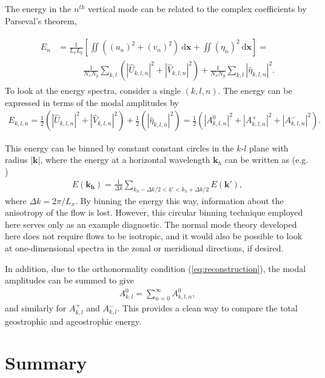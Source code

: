 The energy in the $n^{th}$ vertical mode can be related to the complex coefficients by Parseval's theorem,

\begin{align}
\begin{split}
E_n &= \frac{1}{L_x L_y} \left[ \iint ( (u_n)^2 + (v_n)^2) ~\text{d}\mathbf{x}  + \iint (\eta_n)^2 ~\text{d}\mathbf{x} \right]  = \\
&\quad\quad\quad \frac{1}{N_x N_y} \sum_{k,l} (|\widehat{U}_{k,l,n}|^2 + |\widehat{V}_{k,l,n}|^2) + \frac{1}{N_x N_y} \sum_{k,l} |\widehat{\eta}_{k,l,n}|^2.
\end{split}
\end{align}
To look at the energy spectra, consider a single $(k,l,n)$. The energy can be expressed in terms of the modal amplitudes by
\begin{align}
E_{k,l,n} = \frac{1}{2} \left( |\widehat{U}_{k,l,n}|^2 + |\widehat{V}_{k,l,n}|^2 \right) + \frac{1}{2} \left(|\widehat{\eta}_{k,l,n}|^2 \right) = \frac{1}{2} \left( |A^0_{k,l,n}|^2 + |A^+_{k,l,n}|^2 + |A^-_{k,l,n}|^2 \right).\label{eq:energyDecomp}
\end{align}

This energy can be binned by constant  constant circles in the $k$-$l$ plane with radius $|\mathbf{k}|$, where the energy at a horizontal wavelength $\mathbf{k}_h$ can be written as (e.g. \cite{Waite2004})
\begin{align}
E(\mathbf{k_h}) = \frac{1}{\Delta k} \sum_{k_h - \Delta k/2 < k' < k_h + \Delta k/2} E(\mathbf{k'}), \label{eq:binning}
\end{align}
where $\Delta k = 2\pi/L_x$. By binning the energy this way, information about the anisotropy of the flow is lost. However, this circular binning technique employed here serves only as an example diagnostic. The normal mode theory developed here does not require flows to be isotropic, and it would also be possible to look at one-dimensional spectra in the zonal or meridional directions, if desired.

In addition, due to the orthonormality condition (\ref{eq:reconstruction}), the modal amplitudes can be summed to give
\begin{align}
A^0_{k,l} = \sum_{n=0}^\infty A^0_{k,l,n},
\end{align}
and similarly for $A^+_{k,l}$ and $A^-_{k,l}$. This provides a clean way to compare the total geostrophic and ageostrophic energy.

\section{Summary}

